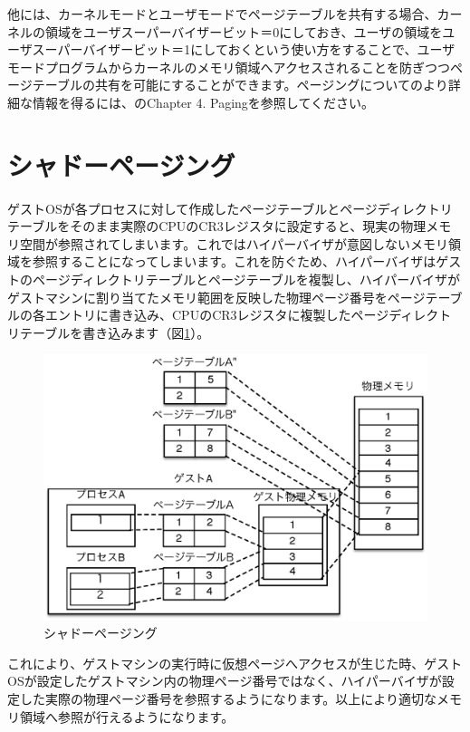他には、カーネルモードとユーザモードでページテーブルを共有する場合、カーネルの領域をユーザスーパーバイザービット＝0にしておき、ユーザの領域をユーザスーパーバイザービット＝1にしておくという使い方をすることで、ユーザモードプログラムからカーネルのメモリ領域へアクセスされることを防ぎつつページテーブルの共有を可能にすることができます。ページングについてのより詳細な情報を得るには、\cite{SDM}のChapter 4. Pagingを参照してください。

\section{シャドーページング}
ゲストOSが各プロセスに対して作成したページテーブルとページディレクトリテーブルをそのまま実際のCPUのCR3レジスタに設定すると、現実の物理メモリ空間が参照されてしまいます。これではハイパーバイザが意図しないメモリ領域を参照することになってしまいます。これを防ぐため、ハイパーバイザはゲストのページディレクトリテーブルとページテーブルを複製し、ハイパーバイザがゲストマシンに割り当てたメモリ範囲を反映した物理ページ番号をページテーブルの各エントリに書き込み、CPUのCR3レジスタに複製したページディレクトリテーブルを書き込みます（図\ref{fig6}）。

\begin{figure}\centering
\includegraphics{figures/part2_fig6.eps}
\caption{シャドーページング}
\label{fig6}
\end{figure}

これにより、ゲストマシンの実行時に仮想ページへアクセスが生じた時、ゲストOSが設定したゲストマシン内の物理ページ番号ではなく、ハイパーバイザが設定した実際の物理ページ番号を参照するようになります。以上により適切なメモリ領域へ参照が行えるようになります。

